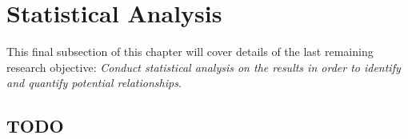 \section{Statistical Analysis}

This final subsection of this chapter will cover details of the last remaining research objective: \emph{Conduct statistical analysis on the results in order to identify and quantify potential relationships}.

\subsection{TODO}